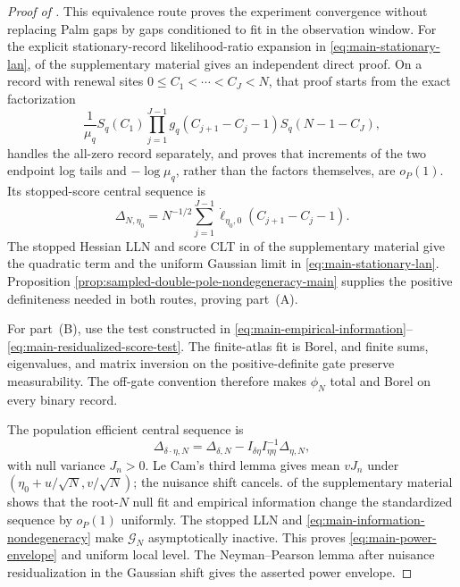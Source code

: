 \begin{proof}[Proof of ]
This equivalence route proves the experiment convergence without replacing
Palm gaps by gaps conditioned to fit in the observation window.  For the
explicit stationary-record likelihood-ratio expansion in \eqref{eq:main-stationary-lan},
 of the supplementary material gives an independent
direct proof.  On a record with renewal sites
\(0\le C_1<\cdots<C_J<N\), that proof starts from the exact factorization
\begin{equation}
 \frac1{\mu_q}S_q(C_1)
 \prod_{j=1}^{J-1}g_q(C_{j+1}-C_j-1)S_q(N-1-C_J),
\label{eq:main-stationary-factorization}
\end{equation}
handles the all-zero record separately, and proves that increments of the
two endpoint log tails and \(-\log\mu_q\), rather than the factors
themselves, are \(o_P(1)\).  Its stopped-score central sequence is
\begin{equation}
 \Delta_{N,\eta_0}=N^{-1/2}
 \sum_{j=1}^{J-1}\dot\ell_{\eta_0,0}(C_{j+1}-C_j-1).
\label{eq:main-stopped-score}
\end{equation}
The stopped Hessian LLN and score CLT in
 of the supplementary material give the quadratic term and the
uniform Gaussian limit in \eqref{eq:main-stationary-lan}.  Proposition
\ref{prop:sampled-double-pole-nondegeneracy-main} supplies the positive
definiteness needed in both routes, proving part~\textup{(A)}.

For part~\textup{(B)}, use the test constructed in
\eqref{eq:main-empirical-information}--\eqref{eq:main-residualized-score-test}.  The finite-atlas fit is Borel, and finite
sums, eigenvalues, and matrix inversion on the positive-definite gate preserve
measurability.  The off-gate convention therefore makes \(\phi_N\) total and
Borel on every binary record.

The population efficient central sequence is
\begin{equation}
 \Delta_{\delta\cdot\eta,N}
 =\Delta_{\delta,N}
 -I_{\delta\eta}I_{\eta\eta}^{-1}\Delta_{\eta,N},
\label{eq:main-efficient-central-sequence}
\end{equation}
with null variance \(J_n>0\).  Le Cam's third lemma gives mean \(vJ_n\)
under \((\eta_0+u/\sqrt N,v/\sqrt N)\); the nuisance shift cancels.
 of the supplementary material shows that the root-\(N\) null fit and
empirical information change the standardized sequence by \(o_P(1)\)
uniformly.  The stopped LLN and \eqref{eq:main-information-nondegeneracy} make \(\mathcal G_N\)
asymptotically inactive.  This proves \eqref{eq:main-power-envelope} and uniform local level.
The Neyman--Pearson lemma after nuisance residualization in the Gaussian shift
gives the asserted power envelope.


\end{proof}
